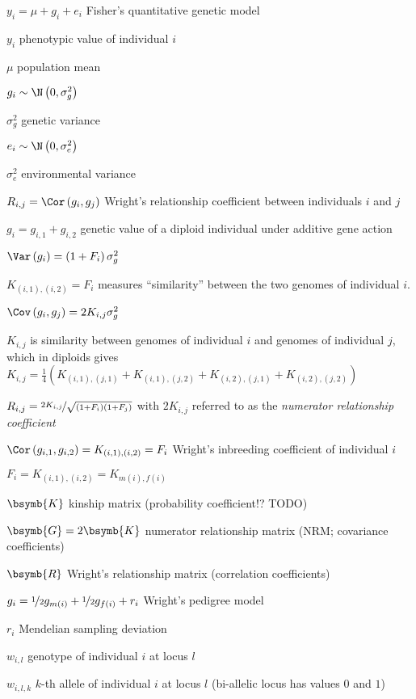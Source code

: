 
$y_i = \mu + g_i + e_i$ Fisher's quantitative genetic model

$y_i$ phenotypic value of individual $i$

$\mu$ population mean

$g_i \sim \N\left(0,\sigma_g^2\right)$

$\sigma_g^2$ genetic variance

$e_i \sim \N\left(0,\sigma_e^2\right)$

$\sigma_e^2$ environmental variance

$R_{i,j} = \Cor\left(g_i, g_j\right)$ Wright's relationship coefficient between individuals $i$ and $j$

$g_i = g_{i,1} + g_{i,2}$ genetic value of a diploid individual under additive gene action

$\Var\left(g_i\right)=\left(1 + F_i\right)\sigma_g^2$

$K_{(i,1),(i,2)} = F_i$ measures ``similarity'' between the two genomes of individual $i$.

$\Cov\left(g_i, g_j\right)=2K_{i,j}\sigma_g^2$

$K_{i,j}$ is similarity between genomes of individual $i$ and genomes of individual $j$, which in diploids gives
$K_{i,j} = \frac{1}{4}\left(
  K_{(i,1), (j,1)} +
  K_{(i,1), (j,2)} +
  K_{(i,2), (j,1)} +
  K_{(i,2), (j,2)}\right)$

$R_{i,j} = \nicefrac{2K_{i,j}}
                    {\sqrt{\left(1 + F_i\right)\left(1 + F_j\right)}}$ with $2K_{i,j}$ referred to as
the \textit{numerator relationship coefficient}

$\Cor\left(g_{i,1}, g_{i,2}\right) = K_{(i,1),(i,2)} = F_i$ Wright's inbreeding coefficient of individual $i$

$F_i=K_{(i,1),(i,2)}=K_{m(i),f(i)}$

$\bsymb{K}$ kinship matrix (probability coefficient!? TODO)

$\bsymb{G} = 2\bsymb{K}$ numerator relationship matrix (NRM; covariance coefficients)

$\bsymb{R}$ Wright's relationship matrix (correlation coefficients)

$g_i = \nicefrac{1}{2}g_{m(i)} + \nicefrac{1}{2}g_{f(i)} + r_i$ Wright's pedigree model

$r_i$ Mendelian sampling deviation

$w_{i,l}$ genotype of individual $i$ at locus $l$

$w_{i,l,k}$ $k$-th allele of individual $i$ at locus $l$ (bi-allelic locus has values $0$ and $1$)

